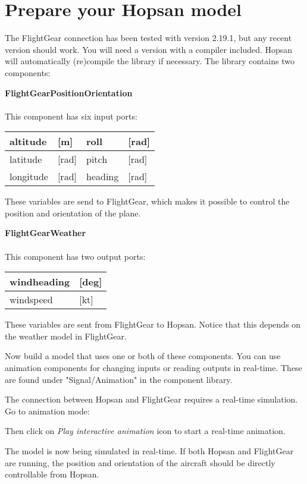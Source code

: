 \documentclass[a4paper]{article}
\begin{document}
\section*{Prepare your Hopsan model}
\begin{tutenumerate}
	The FlightGear connection has been tested with version 2.19.1, but any recent version should work. You will need a version with a compiler included.
	Hopsan will automatically (re)compile the library if necessary. The library contains two components:
	
	\textbf{FlightGearPositionOrientation}\\
	\\
	This component has six input ports:
	
	\begin{tabular}{|l l|l l|}
		\hline
		altitude & [m] & roll & [rad] \\
				\hline
		latitude & [rad] & pitch & [rad] \\
				\hline
		longitude & [rad] & heading & [rad] \\
				\hline
	\end{tabular}

	These variables are send to FlightGear, which makes it possible to control the position and orientation of the plane.
	
	\textbf{FlightGearWeather}\\
	\\
	This component has two output ports:
		
	\begin{tabular}{|l l|}
		\hline
		windheading & [deg]\\
		\hline
		windspeed & [kt]\\
		\hline
	\end{tabular}

	These variables are sent from FlightGear to Hopsan. Notice that this depends on the weather model in FlightGear. 
	
	Now build a model that uses one or both of these components. You can use animation components for changing inputs or reading outputs in real-time. These are found under "Signal/Animation" in the component library.
	
	The connection between Hopsan and FlightGear requires a real-time simulation. Go to animation mode:
	
	
	Then click on \textit{Play interactive animation} icon to start a real-time animation.
	
	
	The model is now being simulated in real-time. If both Hopsan and FlightGear are running, the position and orientation of the aircraft should be directly controllable from Hopsan.
\end{tutenumerate}
\end{document}
